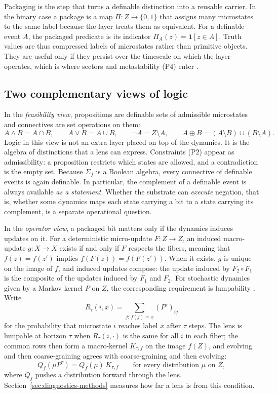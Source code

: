 Packaging is the step that turns a definable distinction into a reusable carrier. In the binary case a package is a map \(\Pi : Z \to \{0,1\}\) that assigns many microstates to the same label because the layer treats them as equivalent. For a definable event \(A\), the packaged predicate is its indicator \(\Pi_A(z) = \mathbf{1}[z \in A]\). Truth values are thus compressed labels of microstates rather than primitive objects. They are useful only if they persist over the timescale on which the layer operates, which is where sectors and metastability (P4) enter \cite{simonando1961aggregation,deuflhardweber2005pcca,shalizi2025macrostate}.

\subsection{Two complementary views of logic}

In the \emph{feasibility view}, propositions are definable sets of admissible microstates and connectives are set operations on them:
\[
A \wedge B = A \cap B,\qquad
A \vee B = A \cup B,\qquad
\neg A = Z \setminus A,\qquad
A \oplus B = (A \setminus B) \cup (B \setminus A).
\]
Logic in this view is not an extra layer placed on top of the dynamics. It is the algebra of distinctions that a lens can express. Constraints (P2) appear as admissibility: a proposition restricts which states are allowed, and a contradiction is the empty set. Because \(\Sigma_f\) is a Boolean algebra, every connective of definable events is again definable. In particular, the complement of a definable event is always available \emph{as a statement}. Whether the substrate can \emph{execute} negation, that is, whether some dynamics maps each state carrying a bit to a state carrying its complement, is a separate operational question.

In the \emph{operator view}, a packaged bit matters only if the dynamics induces updates on it. For a deterministic micro-update \(F: Z \to Z\), an induced macro-update \(g: X\to X\) exists if and only if \(F\) respects the fibers, meaning that \(f(z)=f(z')\) implies \(f(F(z))=f(F(z'))\). When it exists, \(g\) is unique on the image of \(f\), and induced updates compose: the update induced by \(F_2\circ F_1\) is the composite of the updates induced by \(F_1\) and \(F_2\). For stochastic dynamics given by a Markov kernel \(P\) on \(Z\), the corresponding requirement is lumpability \cite{kemeny1976finite,buchholz1994lumpability,simonando1961aggregation,givon2004extracting}. Write
\[
R_\tau(i,x) = \sum_{j:\,f(j)=x} (P^\tau)_{ij}
\]
for the probability that microstate \(i\) reaches label \(x\) after \(\tau\) steps. The lens is lumpable at horizon \(\tau\) when \(R_\tau(i,\cdot)\) is the same for all \(i\) in each fiber; the common rows then form a macro-kernel \(K_{\tau,f}\) on the image \(f(Z)\), and evolving and then coarse-graining agrees with coarse-graining and then evolving:
\[
Q_f(\mu P^\tau) = Q_f(\mu)\,K_{\tau,f}\qquad\text{for every distribution } \mu \text{ on } Z,
\]
where \(Q_f\) pushes a distribution forward through the lens. Section~\ref{sec:diagnostics-methods} measures how far a lens is from this condition.

